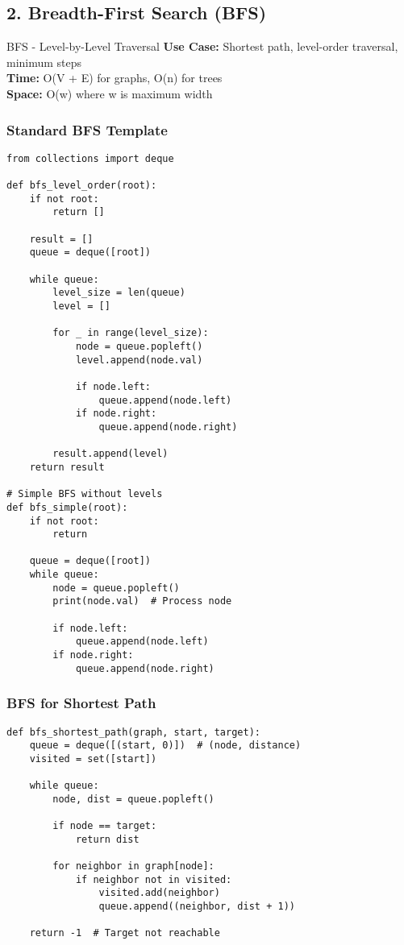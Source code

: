 \documentclass[10pt,a4paper]{article}
\begin{document}
\subsection{2. Breadth-First Search (BFS)}

\begin{patternbox}{BFS - Level-by-Level Traversal}
\textbf{Use Case:} Shortest path, level-order traversal, minimum steps\\
\textbf{Time:} O(V + E) for graphs, O(n) for trees\\
\textbf{Space:} O(w) where w is maximum width
\end{patternbox}

\subsubsection{Standard BFS Template}
\begin{lstlisting}
from collections import deque

def bfs_level_order(root):
    if not root:
        return []

    result = []
    queue = deque([root])

    while queue:
        level_size = len(queue)
        level = []

        for _ in range(level_size):
            node = queue.popleft()
            level.append(node.val)

            if node.left:
                queue.append(node.left)
            if node.right:
                queue.append(node.right)

        result.append(level)
    return result

# Simple BFS without levels
def bfs_simple(root):
    if not root:
        return

    queue = deque([root])
    while queue:
        node = queue.popleft()
        print(node.val)  # Process node

        if node.left:
            queue.append(node.left)
        if node.right:
            queue.append(node.right)
\end{lstlisting}

\subsubsection{BFS for Shortest Path}
\begin{lstlisting}
def bfs_shortest_path(graph, start, target):
    queue = deque([(start, 0)])  # (node, distance)
    visited = set([start])

    while queue:
        node, dist = queue.popleft()

        if node == target:
            return dist

        for neighbor in graph[node]:
            if neighbor not in visited:
                visited.add(neighbor)
                queue.append((neighbor, dist + 1))

    return -1  # Target not reachable
\end{lstlisting}
\end{document}
